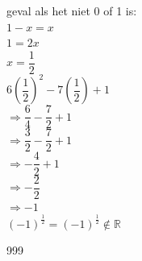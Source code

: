 \documentclass[a4paper]{article}
\begin{document}
geval als het niet 0 of 1 is:\\

$1-x = x$\\

$1 = 2x$\\

$x = \dfrac{1}{2}$\\

$6\left(\dfrac{1}{2}\right)^2 - 7\left(\dfrac{1}{2}\right)+1$\\

$\Rightarrow  \dfrac{6}{4} - \dfrac{7}{2} + 1$\\

$\Rightarrow  \dfrac{3}{2} - \dfrac{7}{2} + 1$ \\

$\Rightarrow  -\dfrac{4}{2} + 1$ \\

$\Rightarrow  -\dfrac{2}{2}$ \\

$\Rightarrow  -1$ \\

$\left(-1\right)^{\tfrac{1}{2}} = \left(-1\right)^{\tfrac{1}{2}} \notin \mathbb{R}$



\begin{thebibliography}{999}
\end{thebibliography}
\end{document}
